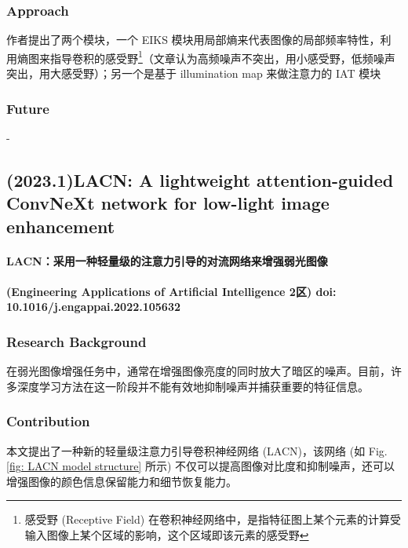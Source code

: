 \documentclass[a4paper, 10pt]{article}
\begin{document}
			\subsubsection{Approach}
			
			作者提出了两个模块，一个 EIKS 模块用局部熵来代表图像的局部频率特性，利用熵图来指导卷积的感受野\footnote{感受野 (Receptive Field) 在卷积神经网络中，是指特征图上某个元素的计算受输入图像上某个区域的影响，这个区域即该元素的感受野}（文章认为高频噪声不突出，用小感受野，低频噪声突出，用大感受野）；另一个是基于 illumination map 来做注意力的 IAT 模块
			
			\subsubsection{Future}
		
			-
			
		\subsection{(2023.1)LACN: A lightweight attention-guided ConvNeXt network for low-light image enhancement}
			
		\paragraph{LACN：采用一种轻量级的注意力引导的对流网络来增强弱光图像}
			
		\paragraph{(Engineering Applications of Artificial Intelligence 2区) doi: 10.1016/j.engappai.2022.105632}
			
			\subsubsection{Research Background}
				
			在弱光图像增强任务中，通常在增强图像亮度的同时放大了暗区的噪声。目前，许多深度学习方法在这一阶段并不能有效地抑制噪声并捕获重要的特征信息。
			
			\subsubsection{Contribution}
			
			本文提出了一种新的轻量级注意力引导卷积神经网络 (LACN)，该网络 (如 Fig. \ref{fig: LACN model structure} 所示) 不仅可以提高图像对比度和抑制噪声，还可以增强图像的颜色信息保留能力和细节恢复能力。
			
\end{document}
